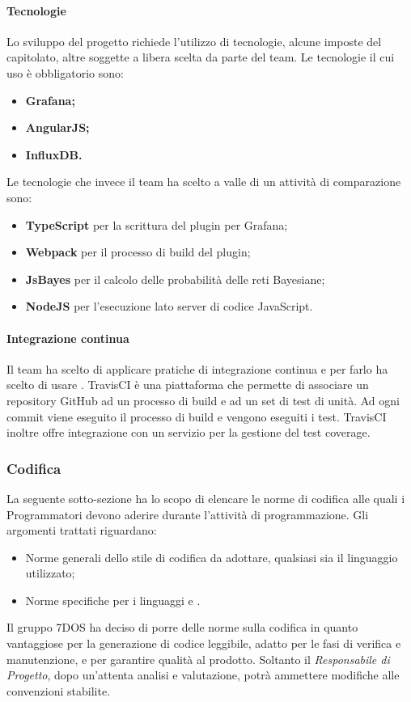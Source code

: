 \paragraph{Tecnologie}\Spazio
Lo sviluppo del progetto richiede l'utilizzo di tecnologie, alcune imposte del capitolato, altre soggette a libera scelta da parte del team.
Le tecnologie il cui uso è obbligatorio sono:
\begin{itemize}
\item\textbf{{Grafana;}}
\item\textbf{{AngularJS;}}
\item\textbf{{InfluxDB.}}
\end{itemize}
Le tecnologie che invece il team ha scelto a valle di un attività di comparazione sono:
\begin{itemize}
\item\textbf{{TypeScript}} per la scrittura del plugin per Grafana;
\item\textbf{{Webpack}} per il processo di build del plugin;
\item\textbf{{JsBayes}} per il calcolo delle probabilità delle reti Bayesiane;
\item\textbf{{NodeJS}} per l'esecuzione lato server di codice JavaScript.
\end{itemize}
\paragraph{Integrazione continua}\Spazio
Il team ha scelto di applicare pratiche di integrazione continua e per farlo ha scelto di usare .
TravisCI è una piattaforma che permette di associare un repository GitHub ad un processo di build e ad un set di test di unità.
Ad ogni commit viene eseguito il processo di build e vengono eseguiti i test. TravisCI inoltre offre integrazione con  un
servizio per la gestione del test coverage.
\subsubsection{Codifica}
La seguente sotto-sezione ha lo scopo di elencare le norme di codifica alle quali i Programmatori devono aderire durante l'attività di programmazione. Gli argomenti trattati riguardano:
\begin{itemize}
 \item{Norme generali dello stile di codifica da adottare, qualsiasi sia il linguaggio utilizzato;}
 \item{Norme specifiche per i linguaggi    e .}
\end{itemize}
Il gruppo 7DOS ha deciso di porre delle norme sulla codifica in quanto vantaggiose per la generazione di codice leggibile, adatto per le fasi di verifica e manutenzione, e per garantire qualità al prodotto.
Soltanto il \emph{Responsabile di Progetto}, dopo un'attenta analisi e valutazione, potrà ammettere modifiche alle convenzioni stabilite.\\
